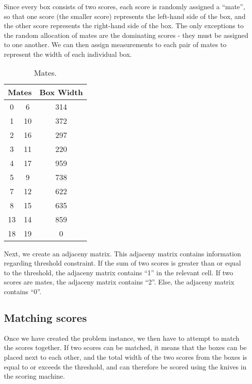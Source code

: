 \documentclass[a4paper, 11pt, twoside, onecolumn, openany]{article}
\begin{document}
Since every box consists of two scores, each score is randomly assigned a ``mate'', so that one score (the smaller score) represents the left-hand side of the box, and the other score represents the right-hand side of the box. The only exceptions to the random allocation of mates are the dominating scores - they must be assigned to one another. We can then assign measurements to each pair of mates to represent the width of each individual box. %

\begin{table}[htb]
	\centering
	\begin{tabular}{|c|c|c|}
	\hline
	\multicolumn{2}{|c|}{Mates} & Box Width \\ \hline
	0 & 6 & 314 \\ \hline
	1 & 10 & 372 \\ \hline
	2 & 16 & 297 \\ \hline
	3 & 11 & 220 \\ \hline
	4 & 17 & 959 \\ \hline
	5 & 9 & 738 \\ \hline
	7 & 12 & 622 \\ \hline
	8 & 15 & 635 \\ \hline
	13 & 14 & 859 \\ \hline
	18 & 19 & 0 \\
	\hline
	\end{tabular}
	\caption{Mates.}
	\label{table:mates}
\end{table}	

Next, we create an adjaceny matrix. This adjaceny matrix contains information regarding threshold constraint. If the sum of two scores is greater than or equal to the threshold, the adjaceny matrix contains ``1'' in the relevant cell. If two scores are mates, the adjaceny matrix contains ``2''. Else, the adjaceny matrix contains ``0''. %

\subsection{Matching scores}
Once we have created the problem instance, we then have to attempt to match the scores together. If two scores can be matched, it means that the boxes can be placed next to each other, and the total width of the two scores from the boxes is equal to or exceeds the threshold, and can therefore be scored using the knives in the scoring machine. 
\end{document}
